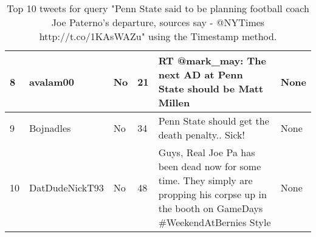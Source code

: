 \documentclass[10pt]{proc}
\begin{document}
\begin{table*}
\begin{tabular}{| l | l | l | l | p{6.5cm} | p{2cm} |}
      \hline
      8 & avalam00 & No & 21 & RT @mark\_may: The next AD at Penn State should be Matt Millen & None \\
      \hline
      9 & Bojnadles & No & 34 & Penn State should get the death penalty.. Sick! & None \\
      \hline
      10 & DatDudeNickT93 & No & 48 & Guys, Real Joe Pa has been dead now for some time. They simply are propping his corpse up in the booth on GameDays \#WeekendAtBernies Style & None \\
      \hline
    \end{tabular}
    \caption{Top 10 tweets for query "Penn State said to be planning football coach Joe Paterno's departure, sources say - @NYTimes http://t.co/1KAsWAZu" using the Timestamp method.}
    \label{PennStateTimestamp}  
  \end{table*}
  
\end{document}
